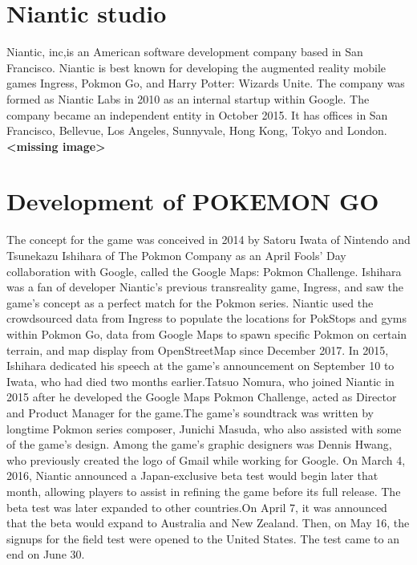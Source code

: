\documentclass[a4paper,10pt]{book}
\begin{document}
 \section{Niantic studio  }
 Niantic, inc,is an American software development company based in San Francisco. Niantic is best known for developing the augmented reality mobile games Ingress, Pokmon Go, and Harry Potter: Wizards Unite. The company was formed as Niantic Labs in 2010 as an internal startup within Google. The company became an independent entity in October 2015. It has offices in San Francisco, Bellevue, Los Angeles, Sunnyvale, Hong Kong, Tokyo and London. 
 \textbf{<missing image>}
 \section{Development of POKEMON GO }
 The concept for the game was conceived in 2014 by Satoru Iwata of Nintendo and Tsunekazu Ishihara of The Pokmon Company as an April Fools' Day collaboration with Google, called the Google Maps: Pokmon Challenge. Ishihara was a fan of developer Niantic's previous transreality game, Ingress, and saw the game's concept as a perfect match for the Pokmon series. Niantic used the crowdsourced data from Ingress to populate the locations for PokStops and gyms within Pokmon Go, data from Google Maps to spawn specific Pokmon on certain terrain, and map display from OpenStreetMap since December 2017. In 2015, Ishihara dedicated his speech at the game's announcement on September 10 to Iwata, who had died two months earlier.Tatsuo Nomura, who joined Niantic in 2015 after he developed the Google Maps Pokmon Challenge, acted as Director and Product Manager for the game.The game's soundtrack was written by longtime Pokmon series composer, Junichi Masuda, who also assisted with some of the game's design. Among the game's graphic designers was Dennis Hwang, who previously created the logo of Gmail while working for Google.  
 On March 4, 2016, Niantic announced a Japan-exclusive beta test would begin later that month, allowing players to assist in refining the game before its full release. The beta test was later expanded to other countries.On April 7, it was announced that the beta would expand to Australia and New Zealand. Then, on May 16, the signups for the field test were opened to the United States. The test came to an end on June 30. 
\end{document}
